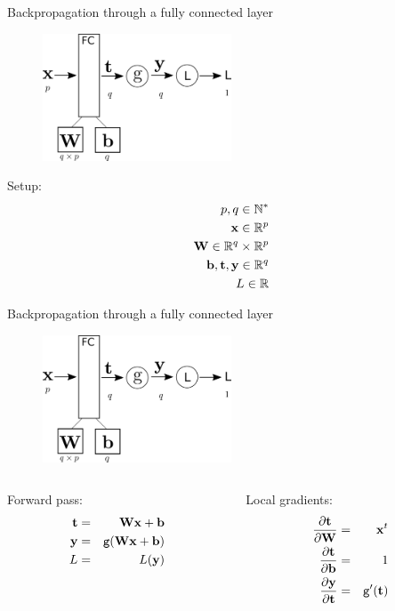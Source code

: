 \documentclass[xcolor=pdftex,dvipsnames,table,mathserif]{beamer}
\begin{document}
\begin{frame}{Backpropagation through a fully connected layer}
\begin{figure}
\includegraphics[width=0.5\textwidth]{bp_fc.png}
\end{figure}

Setup:
\begin{eqnarray*}
p, q \in \mathbb{N}^*\\
\mathbf{x} \in \mathbb{R}^p \\
\mathbf{W} \in \mathbb{R}^q \times \mathbb{R}^p \\
\mathbf{b}, \mathbf{t}, \mathbf{y} \in \mathbb{R}^q \\
L \in \mathbb{R}
\end{eqnarray*}

\end{frame}

\begin{frame}{Backpropagation through a fully connected layer}
\begin{figure}
\includegraphics[width=0.5\textwidth]{bp_fc.png}
\end{figure}

\begin{columns}
  \begin{column}{0.5\textwidth}
    Forward pass:
    \begin{eqnarray*}
      \mathbf{t} &=& \mathbf{W}\mathbf{x} + \mathbf{b} \\
      \mathbf{y} &=& \texttt{g}(\mathbf{W}\mathbf{x} + \mathbf{b}) \\
      L &=& L(\mathbf{y})
    \end{eqnarray*}
  \end{column}

  \begin{column}{0.5\textwidth}
    Local gradients:
    \begin{eqnarray*}
      \pdv{\mathbf{t}}{\mathbf{W}} &=& \mathbf{x}^t \\
      \pdv{\mathbf{t}}{\mathbf{b}} &=& 1 \\
      \pdv{\mathbf{y}}{\mathbf{t}} &=& \texttt{g}'(\mathbf{t})
    \end{eqnarray*}
  \end{column}
\end{columns}

\end{frame}
\end{document}
